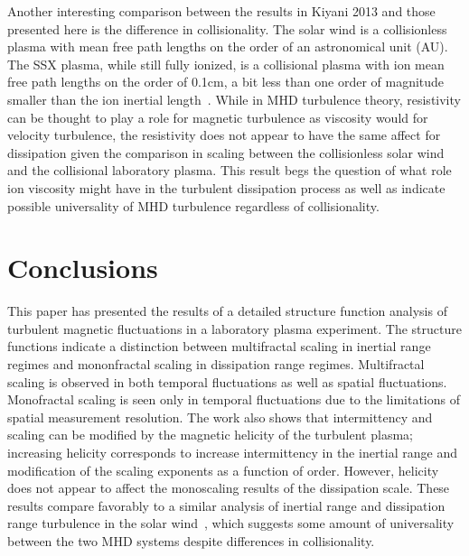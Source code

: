 \documentclass[preprint2]{aastex}
\begin{document}
Another interesting comparison between the results in Kiyani 2013 and those presented here is the difference in collisionality. The solar wind is a collisionless plasma with mean free path lengths on the order of an astronomical unit (AU). The SSX plasma, while still fully ionized, is a collisional plasma with ion mean free path lengths on the order of 0.1cm, a bit less than one order of magnitude smaller than the ion inertial length~\citep{schaffner2014c}. While in MHD turbulence theory, resistivity can be thought to play a role for magnetic turbulence as viscosity would for velocity turbulence, the resistivity does not appear to have the same affect for dissipation given the comparison in scaling between the collisionless solar wind and the collisional laboratory plasma. This result begs the question of what role ion viscosity might have in the turbulent dissipation process as well as indicate possible universality of MHD turbulence regardless of collisionality.

\section{Conclusions}\label{sec:conclusions}

This paper has presented the results of a detailed structure function analysis of turbulent magnetic fluctuations in a laboratory plasma experiment. The structure functions indicate a distinction between multifractal scaling in inertial range regimes and mononfractal scaling in dissipation range regimes. Multifractal scaling is observed in both temporal fluctuations as well as spatial fluctuations. Monofractal scaling is seen only in temporal fluctuations due to the limitations of spatial measurement resolution. The work also shows that intermittency and scaling can be modified by the magnetic helicity of the turbulent plasma; increasing helicity corresponds to increase intermittency in the inertial range and modification of the scaling exponents as a function of order. However, helicity does not appear to affect the monoscaling results of the dissipation scale. These results compare favorably to a similar analysis of inertial range and dissipation range turbulence in the solar wind~\citep{kiyani2013}, which suggests some amount of universality between the two MHD systems despite differences in collisionality.
\end{document}
